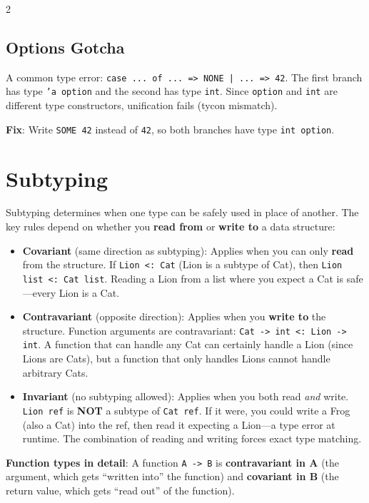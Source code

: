 \documentclass[9pt,landscape]{extarticle}
\begin{document}
\begin{multicols}{2}
\subsection{Options Gotcha}

A common type error: \texttt{case ... of ... => NONE | ... => 42}. The first branch has type \texttt{'a option} and the second has type \texttt{int}. Since \texttt{option} and \texttt{int} are different type constructors, unification fails (tycon mismatch).

\textbf{Fix}: Write \texttt{SOME 42} instead of \texttt{42}, so both branches have type \texttt{int option}.

\section{Subtyping}

Subtyping determines when one type can be safely used in place of another. The key rules depend on whether you \textbf{read from} or \textbf{write to} a data structure:

\begin{itemize}
  \item \textbf{Covariant} (same direction as subtyping): Applies when you can only \textbf{read} from the structure. If \texttt{Lion <: Cat} (Lion is a subtype of Cat), then \texttt{Lion list <: Cat list}. Reading a Lion from a list where you expect a Cat is safe---every Lion is a Cat.
  \item \textbf{Contravariant} (opposite direction): Applies when you \textbf{write to} the structure. Function arguments are contravariant: \texttt{Cat -> int <: Lion -> int}. A function that can handle any Cat can certainly handle a Lion (since Lions are Cats), but a function that only handles Lions cannot handle arbitrary Cats.
  \item \textbf{Invariant} (no subtyping allowed): Applies when you both read \emph{and} write. \texttt{Lion ref} is \textbf{NOT} a subtype of \texttt{Cat ref}. If it were, you could write a Frog (also a Cat) into the ref, then read it expecting a Lion---a type error at runtime. The combination of reading and writing forces exact type matching.
\end{itemize}

\textbf{Function types in detail}: A function \texttt{A -> B} is \textbf{contravariant in A} (the argument, which gets ``written into'' the function) and \textbf{covariant in B} (the return value, which gets ``read out'' of the function).


\end{multicols}
\end{document}
